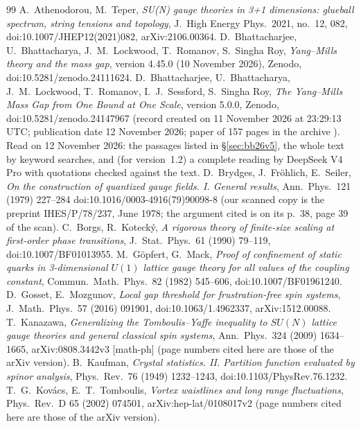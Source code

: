 \documentclass[11pt,a4paper]{article}
\theoremstyle{plain}
\theoremstyle{definition}
\theoremstyle{remark}
\numberwithin{equation}{section}
\begin{document}
{\small
\begin{thebibliography}{99}\setlength{\itemsep}{1pt}
 A.~Athenodorou, M.~Teper, \emph{SU(N) gauge theories in 3+1 dimensions: glueball spectrum, string tensions and
topology}, J.\ High Energy Phys.\ 2021, no.~12, 082, doi:10.1007/JHEP12(2021)082, arXiv:2106.00364.
 D.~Bhattacharjee, U.~Bhattacharya, J.~M.~Lockwood, T.~Romanov, S.~Singha Roy, \emph{Yang--Mills theory and the mass
gap}, version 4.45.0 (10 November 2026), Zenodo, doi:10.5281/zenodo.24111624.
 D.~Bhattacharjee, U.~Bhattacharya, J.~M.~Lockwood, T.~Romanov, I.~J.~Sessford, S.~Singha Roy, \emph{The Yang--Mills Mass
Gap from One Bound at One Scale}, version 5.0.0, Zenodo, doi:10.5281/zenodo.24147967 (record created on 11 November 2026 at 23:29:13 UTC;
publication date 12 November 2026; paper of 157 pages in the archive ). Read on 12 November 2026: the passages listed in \S\ref{sec:bb26v5}, the whole text by keyword searches, and (for version~1.2) a complete reading by DeepSeek V4 Pro with quotations checked against the text.
 D.~Brydges, J.~Fr\"ohlich, E.~Seiler, \emph{On the construction of quantized gauge fields. I. General results}, Ann.\ Phys.\ 121 (1979) 227--284 doi:10.1016/0003-4916(79)90098-8 (our scanned copy is the preprint IHES/P/78/237, June 1978; the argument cited is on its p.~38, page 39 of the scan).
 C.~Borgs, R.~Koteck\'y, \emph{A rigorous theory of finite-size scaling at first-order phase transitions}, J.\ Stat.\
Phys.\ 61 (1990) 79--119, doi:10.1007/BF01013955.
 M.~G\"opfert, G.~Mack, \emph{Proof of confinement of static quarks in 3-dimensional $U(1)$ lattice gauge theory for all
values of the coupling constant}, Commun.\ Math.\ Phys.\ 82 (1982) 545--606, doi:10.1007/BF01961240.
\bibitem{GM16} D.~Gosset, E.~Mozgunov, \emph{Local gap threshold for frustration-free spin systems}, J.\ Math.\ Phys.\ 57 (2016)
091901, doi:10.1063/1.4962337, arXiv:1512.00088.
 T.~Kanazawa, \emph{Generalizing the Tomboulis--Yaffe inequality to $SU(N)$ lattice gauge theories and general classical spin systems}, Ann.\ Phys.\ 324 (2009) 1634--1665, arXiv:0808.3442v3 [math-ph] (page numbers cited here are those of the arXiv version).
\bibitem{Kau49} B.~Kaufman, \emph{Crystal statistics. II. Partition function evaluated by spinor analysis}, Phys.\ Rev.\ 76 (1949)
1232--1243, doi:10.1103/PhysRev.76.1232.
 T.~G.~Kov\'acs, E.~T.~Tomboulis, \emph{Vortex waistlines and long range fluctuations}, Phys.\ Rev.\ D 65 (2002) 074501, arXiv:hep-lat/0108017v2 (page numbers cited here are those of the arXiv version).

\end{thebibliography}}
\end{document}
